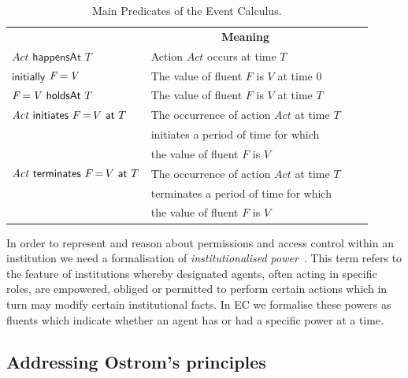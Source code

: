 \begin{table}[htbp]
\caption{Main Predicates  of the Event Calculus.}\label{table:ec}
\begin{center}
\renewcommand{\arraystretch}{0.9}
\setlength\tabcolsep{3pt}
\begin{tabular}{llcc}
\hline\noalign{\smallskip}
\multicolumn{1}{c}{\textbf{Predicate}} & \multicolumn{1}{c}{\textbf{Meaning}}  \\
\noalign{\smallskip}
\hline
\noalign{\smallskip}
$\mathit{Act} \,\, \mathsf{happensAt} \,\, T $ & Action $\mathit{Act}$ occurs at time $T$  \\[2pt]
$\mathsf{initially}$ $\mathit{F \operatorname{=} V}$ & The value of fluent $F$ is $V$ at time $0$  \\[2pt] 
$\mathit{F \operatorname{=} V} \,\, \mathsf{holdsAt} \,\, T$ & The value of fluent $F$ is $V$ at time $T$ 
\\[2pt] 
$\mathit{Act} \,\, \mathsf{initiates} \,\, F \operatorname{=} V \,\, \mathsf{at} \,\, T$ & The occurrence of action $\mathit{Act}$ at time $T$ \\ 
& initiates a period of time for which \\
& the value of fluent $F$ is $V$ \\[2pt] 
$\mathit{Act} \,\, \mathsf{terminates} \,\, F \operatorname{=} V \,\, \mathsf{at} \,\, T$ & The occurrence of action $\mathit{Act}$ at time $T$ \\
& terminates a period of time for which \\
& the value of fluent $F$ is $V$  \\
\hline
\end{tabular}
\end{center}
\end{table}

In order to represent and reason about permissions and access control within an institution we need a formalisation of \emph{institutionalised power}~\citep{Jones1996}. 
This term refers to the feature of institutions whereby designated agents, often acting in specific roles, are empowered, obliged or permitted to perform certain actions which in turn may modify certain institutional facts. 
In \ac{EC} we formalise these powers as fluents which indicate whether an agent has or had a specific power at a time.

\subsection{Addressing Ostrom's principles}
%

